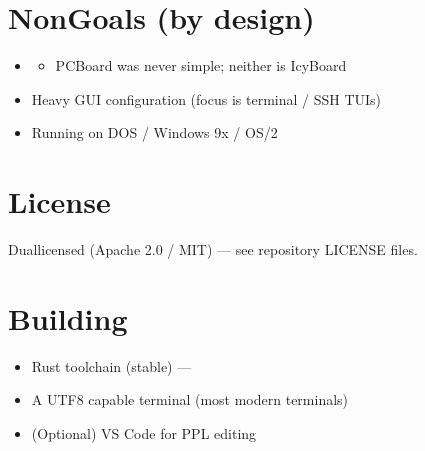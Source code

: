 \documentclass[letterpaper,10pt,english]{sphinxmanual}
\begin{document}
\section{Non\sphinxhyphen{}Goals (by design)}
\label{\detokenize{index:non-goals-by-design}}\begin{itemize}
\item {} \begin{description}
\begin{itemize}
\item {} 
\sphinxAtStartPar
PCBoard was never simple; neither is IcyBoard

\end{itemize}

\end{description}

\item {} 
\sphinxAtStartPar
Heavy GUI configuration (focus is terminal / SSH TUIs)

\item {} 
\sphinxAtStartPar
Running on DOS / Windows 9x / OS/2

\end{itemize}


\section{License}
\label{\detokenize{index:license}}
\sphinxAtStartPar
Dual\sphinxhyphen{}licensed (Apache 2.0 / MIT) — see repository LICENSE files.


\section{Building}
\label{\detokenize{index:building}}\begin{description}
\begin{itemize}
\item {} 
\sphinxAtStartPar
Rust toolchain (stable) — 

\item {} 
\sphinxAtStartPar
A UTF\sphinxhyphen{}8 capable terminal (most modern terminals)

\item {} 
\sphinxAtStartPar
(Optional) VS Code for PPL editing

\end{itemize}

\end{description}
\end{document}

